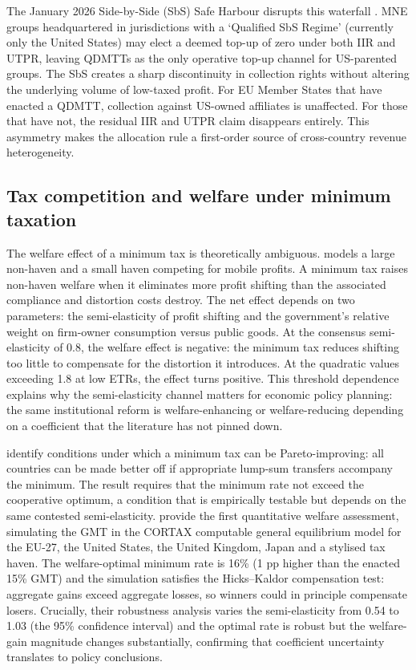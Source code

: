 \documentclass[11pt,a4paper]{article}
\begin{document}
The January 2026 Side-by-Side (SbS) Safe Harbour disrupts this waterfall \citep{oecd2026}. MNE groups headquartered in jurisdictions with a `Qualified SbS Regime' (currently only the United States) may elect a deemed top-up of zero under both IIR and UTPR, leaving QDMTTs as the only operative top-up channel for US-parented groups. The SbS creates a sharp discontinuity in collection rights without altering the underlying volume of low-taxed profit. For EU Member States that have enacted a QDMTT, collection against US-owned affiliates is unaffected. For those that have not, the residual IIR and UTPR claim disappears entirely. This asymmetry makes the allocation rule a first-order source of cross-country revenue heterogeneity.

\subsection{Tax competition and welfare under minimum taxation}\label{sec:theory_lit}

The welfare effect of a minimum tax is theoretically ambiguous. \citet{johannesen2022} models a large non-haven and a small haven competing for mobile profits. A minimum tax raises non-haven welfare when it eliminates more profit shifting than the associated compliance and distortion costs destroy. The net effect depends on two parameters: the semi-elasticity of profit shifting and the government's relative weight on firm-owner consumption versus public goods. At the \citet{heckemeyer2017} consensus semi-elasticity of 0.8, the welfare effect is negative: the minimum tax reduces shifting too little to compensate for the distortion it introduces. At the \citet{dowd2017} quadratic values exceeding 1.8 at low ETRs, the effect turns positive. This threshold dependence explains why the semi-elasticity channel matters for economic policy planning: the same institutional reform is welfare-enhancing or welfare-reducing depending on a coefficient that the literature has not pinned down.

\citet{hebous2023} identify conditions under which a minimum tax can be Pareto-improving: all countries can be made better off if appropriate lump-sum transfers accompany the minimum. The result requires that the minimum rate not exceed the cooperative optimum, a condition that is empirically testable but depends on the same contested semi-elasticity. \citet{vantriet2025} provide the first quantitative welfare assessment, simulating the GMT in the CORTAX computable general equilibrium model for the EU-27, the United States, the United Kingdom, Japan and a stylised tax haven. The welfare-optimal minimum rate is 16\% (1 pp higher than the enacted 15\% GMT) and the simulation satisfies the Hicks--Kaldor compensation test: aggregate gains exceed aggregate losses, so winners could in principle compensate losers. Crucially, their robustness analysis varies the semi-elasticity from 0.54 to 1.03 (the \citet{heckemeyer2017} 95\% confidence interval) and the optimal rate is robust but the welfare-gain magnitude changes substantially, confirming that coefficient uncertainty translates to policy conclusions.
\end{document}
